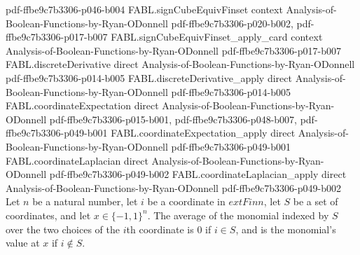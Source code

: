\begin{theorem}
  {pdf-ffbe9c7b3306-p046-b004}
\proofstep
  {FABL.signCubeEquivFinset}
  {context}
  {Analysis-of-Boolean-Functions-by-Ryan-ODonnell}
  {pdf-ffbe9c7b3306-p020-b002,
    pdf-ffbe9c7b3306-p017-b007}
\proofstep
  {FABL.signCubeEquivFinset_apply_card}
  {context}
  {Analysis-of-Boolean-Functions-by-Ryan-ODonnell}
  {pdf-ffbe9c7b3306-p017-b007}
\proofstep
  {FABL.discreteDerivative}
  {direct}
  {Analysis-of-Boolean-Functions-by-Ryan-ODonnell}
  {pdf-ffbe9c7b3306-p014-b005}
\proofstep
  {FABL.discreteDerivative_apply}
  {direct}
  {Analysis-of-Boolean-Functions-by-Ryan-ODonnell}
  {pdf-ffbe9c7b3306-p014-b005}
\proofstep
  {FABL.coordinateExpectation}
  {direct}
  {Analysis-of-Boolean-Functions-by-Ryan-ODonnell}
  {pdf-ffbe9c7b3306-p015-b001,
    pdf-ffbe9c7b3306-p048-b007,
    pdf-ffbe9c7b3306-p049-b001}
\proofstep
  {FABL.coordinateExpectation_apply}
  {direct}
  {Analysis-of-Boolean-Functions-by-Ryan-ODonnell}
  {pdf-ffbe9c7b3306-p049-b001}
\proofstep
  {FABL.coordinateLaplacian}
  {direct}
  {Analysis-of-Boolean-Functions-by-Ryan-ODonnell}
  {pdf-ffbe9c7b3306-p049-b002}
\proofstep
  {FABL.coordinateLaplacian_apply}
  {direct}
  {Analysis-of-Boolean-Functions-by-Ryan-ODonnell}
  {pdf-ffbe9c7b3306-p049-b002}
Let $n$ be a natural number, let $i$ be a coordinate in $	ext{Fin }n$, let $S$ be a set
of coordinates, and let $x\in\{−1,1\}^n$. The average of the monomial indexed by $S$
over the two choices of the $i$th coordinate is $0$ if $i\in S$, and is the monomial's
value at $x$ if $i\notin S$.
\end{theorem}

